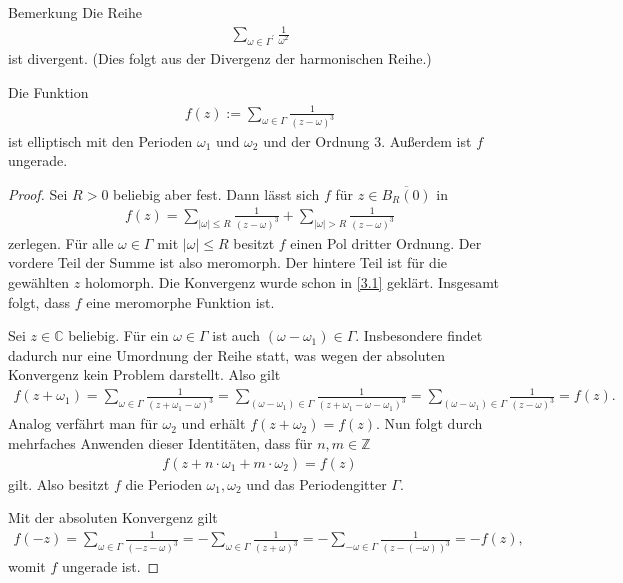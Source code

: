 \begin{genericdef}{Bemerkung}\label{3.2}
Die Reihe
\begin{align*}
\sum \limits_{\omega \in \Gamma^\prime}  \frac{1}{\omega^2}
\end{align*}
ist divergent.
(Dies folgt aus der Divergenz der harmonischen Reihe.)

\end{genericdef}

\begin{sz}\label{3.3}
Die Funktion
\begin{align*}
f(z) := \sum \limits_{\omega \in \Gamma} \frac{1}{(z-\omega)^3}
\end{align*}
ist elliptisch mit den Perioden $\omega_1$ und $\omega_2$ und der 
Ordnung $3$. Außerdem ist $f$ ungerade.
\end{sz}

\begin{proof}
Sei $R > 0$ beliebig aber fest.
Dann lässt sich $f$ für $z \in \overline{B_R(0)}$ in 
\begin{align*}
f(z) = \sum \limits_{|\omega| \leq R} \frac{1}{(z-\omega)^3} + \sum \limits_{|\omega|> R}  \frac{1}{(z-\omega)^3} 
\end{align*}
zerlegen. Für alle $\omega \in \Gamma$ mit $|\omega| \leq R$ besitzt $f$ einen Pol dritter Ordnung.
Der vordere Teil der Summe ist also meromorph.
Der hintere Teil ist für die gewählten $z$ holomorph. 
Die Konvergenz wurde schon in \ref{3.1} geklärt. 
Insgesamt folgt, dass $f$ eine meromorphe Funktion ist.

Sei $z \in \mathbb{C}$ beliebig. Für ein $\omega \in \Gamma$ ist auch $(\omega-\omega_1) \in \Gamma$.
Insbesondere findet dadurch nur eine Umordnung der Reihe statt, was wegen der absoluten Konvergenz kein Problem darstellt. 
Also gilt
\begin{align*}
f(z + \omega_1) 
= \sum \limits_{\omega \in \Gamma} \frac{1}{(z+\omega_1-\omega)^3}
= \sum \limits_{(\omega-\omega_1) \in \Gamma} \frac{1}{(z+\omega_1-\omega-\omega_1)^3}
= \sum \limits_{(\omega-\omega_1) \in \Gamma} \frac{1}{(z-\omega)^3}
=f(z).
\end{align*}
Analog verfährt man für $\omega_2$ und erhält $f(z + \omega_2)= f(z) $.
Nun folgt durch mehrfaches Anwenden dieser Identitäten, dass für $n,m\in \mathbb{Z}$
\begin{align*}
f( z + n \cdot \omega_1 + m \cdot\omega_2) = f(z)  
\end{align*}
gilt. Also besitzt $f$ die Perioden $\omega_1, \omega_2$ und das Periodengitter $\Gamma$.

Mit der absoluten Konvergenz gilt 
\begin{align*}
f(-z) 
= \sum \limits_{\omega \in \Gamma} \frac{1}{(-z-\omega)^3}
= -\sum \limits_{\omega \in \Gamma} \frac{1}{(z+\omega)^3}
= -\sum \limits_{-\omega \in \Gamma} \frac{1}{(z-(-\omega))^3}
=-f(z),
\end{align*}
womit $f$ ungerade ist.
\end{proof}


